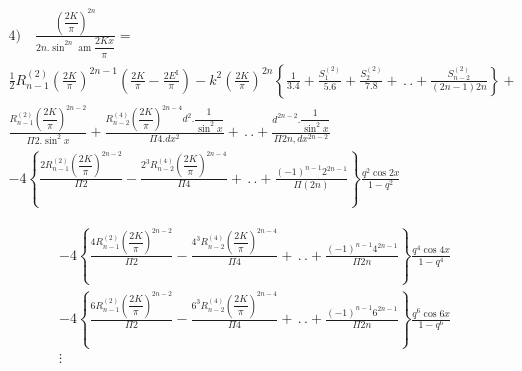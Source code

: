 \documentclass{article}
\begin{document}
\[
\begin{gathered}
\text{4)}\quad\frac{\left(\dfrac{2K}{\pi}\right)^{2n}}{2n.\sin^{2n}\operatorname{am}\dfrac{2Kx}{\pi}}=\\[1.5ex]
\frac{1}{2}R_{n-1}^{(2)}\left(\frac{2K}{\pi}\right)^{2n-1}\left(\frac{2K}{\pi}-\frac{2E^{\mathrm{I}}}{\pi}\right)-k^{2}\left(\frac{2K}{\pi}\right)^{2n}\left\{\frac{1}{3.4}+\frac{S_{1}^{(2)}}{5.6}+\frac{S_{2}^{(2)}}{7.8}+\,.\,.+\frac{S_{n-2}^{(2)}}{(2n-1)2n}\right\}+\\[1.5ex]
\frac{R_{n-1}^{(2)}\left(\dfrac{2K}{\pi}\right)^{2n-2}}{\Pi 2.\sin^{2}x}+\frac{R_{n-2}^{(4)}\left(\dfrac{2K}{\pi}\right)^{2n-4}d^{2}.\dfrac{1}{\sin^{2}x}}{\Pi 4.dx^{2}}+\,.\,.+\frac{d^{2n-2}.\dfrac{1}{\sin^{2}x}}{\Pi 2n,dx^{2n-2}}\\[1.5ex]
-4\left\{\frac{2R_{n-1}^{(2)}\left(\dfrac{2K}{\pi}\right)^{2n-2}}{\Pi 2}-\frac{2^{3}R_{n-2}^{(4)}\left(\dfrac{2K}{\pi}\right)^{2n-4}}{\Pi 4}+\,.\,.+\frac{(-1)^{n-1}2^{2n-1}}{\Pi(2n)}\right\}\frac{q^{2}\cos 2x}{1-q^{2}}
\end{gathered}
\]

\[
\begin{gathered}
-4\left\{\frac{4R_{n-1}^{(2)}\left(\dfrac{2K}{\pi}\right)^{2n-2}}{\Pi 2}-\frac{4^{3}R_{n-2}^{(4)}\left(\dfrac{2K}{\pi}\right)^{2n-4}}{\Pi 4}+\,.\,.+\frac{(-1)^{n-1}4^{2n-1}}{\Pi 2n}\right\}\frac{q^{4}\cos 4x}{1-q^{4}}\\[1.5ex]
-4\left\{\frac{6R_{n-1}^{(2)}\left(\dfrac{2K}{\pi}\right)^{2n-2}}{\Pi 2}-\frac{6^{3}R_{n-2}^{(4)}\left(\dfrac{2K}{\pi}\right)^{2n-4}}{\Pi 4}+\,.\,.+\frac{(-1)^{n-1}6^{2n-1}}{\Pi 2n}\right\}\frac{q^{6}\cos 6x}{1-q^{6}}\\[1.5ex]
\vdots
\end{gathered}
\]
\end{document}
